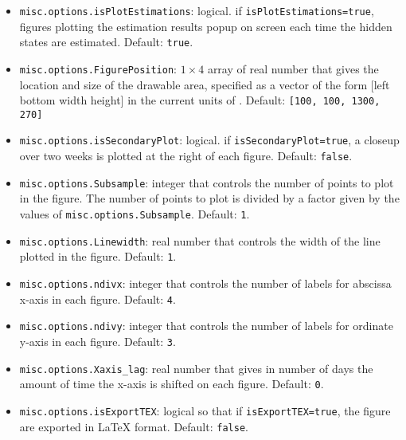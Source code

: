 \begin{itemize}
\begin{itemize}
\item \lstinline[basicstyle = \mlttfamily \small ]!misc.options.isPlotEstimations!: logical. if \lstinline[basicstyle = \mlttfamily \small ]!isPlotEstimations=true!, figures plotting the estimation results popup on screen each time the hidden states are estimated. Default: \lstinline[basicstyle = \mlttfamily \small ]!true!.
\item \lstinline[basicstyle = \mlttfamily \small ]!misc.options.FigurePosition!: $1\times4$ array of real number that gives the location and size of the drawable area, specified as a vector of the form [left bottom width height] in the current units of \MATLAB{}. Default: \lstinline[basicstyle = \mlttfamily \small ]![100, 100, 1300, 270]!
\item \lstinline[basicstyle = \mlttfamily \small ]!misc.options.isSecondaryPlot!: logical. if \lstinline[basicstyle = \mlttfamily \small ]!isSecondaryPlot=true!, a closeup over two weeks is plotted at the right of each figure. Default: \lstinline[basicstyle = \mlttfamily \small ]!false!.
\item \lstinline[basicstyle = \mlttfamily \small ]!misc.options.Subsample!: integer that controls the number of points to plot in the figure. The number of points to plot is divided by a factor given by the values of \lstinline[basicstyle = \mlttfamily \small ]!misc.options.Subsample!. Default: \lstinline[basicstyle = \mlttfamily \small ]!1!.
\item \lstinline[basicstyle = \mlttfamily \small ]!misc.options.Linewidth!: real number that controls the width of the line plotted in the figure. Default: \lstinline[basicstyle = \mlttfamily \small ]!1!.
\item \lstinline[basicstyle = \mlttfamily \small ]!misc.options.ndivx!: integer that controls the number of labels for abscissa x-axis in each figure. Default: \lstinline[basicstyle = \mlttfamily \small ]!4!.
\item \lstinline[basicstyle = \mlttfamily \small ]!misc.options.ndivy!: integer that controls the number of labels for ordinate y-axis in each figure. Default: \lstinline[basicstyle = \mlttfamily \small ]!3!.
\item \lstinline[basicstyle = \mlttfamily \small ]!misc.options.Xaxis_lag!: real number that gives in number of days the amount of time the x-axis is shifted on each figure. Default: \lstinline[basicstyle = \mlttfamily \small ]!0!. 
\item \lstinline[basicstyle = \mlttfamily \small ]!misc.options.isExportTEX!: logical so that if \lstinline[basicstyle = \mlttfamily \small ]!isExportTEX=true!, the figure are exported in \LaTeX{} format. Default: \lstinline[basicstyle = \mlttfamily \small ]!false!.

\end{itemize}
\end{itemize}
